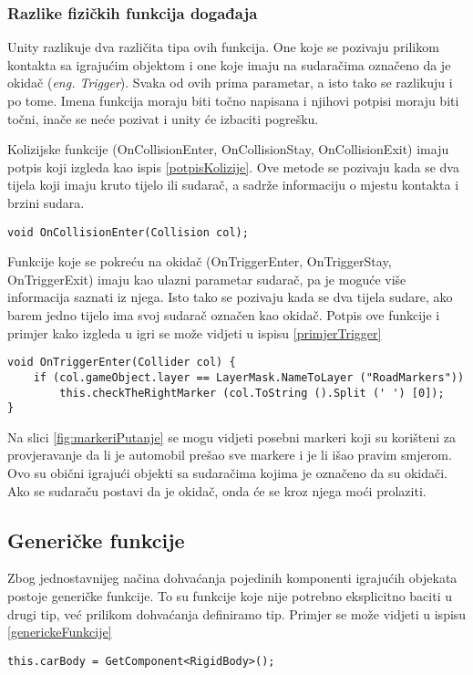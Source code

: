 \subsubsection{Razlike fizičkih funkcija događaja}
Unity razlikuje dva različita tipa ovih funkcija. One koje se pozivaju prilikom kontakta sa igrajućim objektom i one koje imaju na sudaračima označeno da je okidač (\emph{eng. Trigger}). Svaka od ovih prima parametar, a isto tako se razlikuju i po tome. Imena funkcija moraju biti točno napisana i njihovi potpisi moraju biti točni, inače se neće pozivat i unity će izbaciti pogrešku. \par
Kolizijske funkcije (OnCollisionEnter, OnCollisionStay, OnCollisionExit) imaju potpis koji izgleda kao ispis \ref{potpisKolizije}. Ove metode se pozivaju kada se dva tijela koji imaju kruto tijelo ili sudarač, a sadrže informaciju o mjestu kontakta i brzini sudara.
\begin{lstlisting}[caption={Potpis kolizijskih funkcija}, label=potpisKolizije]
void OnCollisionEnter(Collision col);
\end{lstlisting} \par
Funkcije koje se pokreću na okidač (OnTriggerEnter, OnTriggerStay, OnTriggerExit) imaju kao ulazni parametar sudarač, pa je moguće više informacija saznati iz njega. Isto tako se pozivaju kada se dva tijela sudare, ako barem jedno tijelo ima svoj sudarač označen kao okidač. Potpis ove funkcije i primjer kako izgleda u igri se može vidjeti u ispisu \ref{primjerTrigger}
\begin{lstlisting}[caption={Potpis i primjer trigger funkcije}, label=primjerTrigger]
void OnTriggerEnter(Collider col) {
	if (col.gameObject.layer == LayerMask.NameToLayer ("RoadMarkers"))
		this.checkTheRightMarker (col.ToString ().Split (' ') [0]);
}
\end{lstlisting} \par
Na slici \ref{fig:markeriPutanje} se mogu vidjeti posebni markeri koji su korišteni za provjeravanje da li je automobil prešao sve markere i je li išao pravim smjerom. Ovo su obični igrajući objekti sa sudaračima kojima je označeno da su okidači. Ako se sudaraču postavi da je okidač, onda će se kroz njega moći prolaziti. 
\subsection{Generičke funkcije}
Zbog jednostavnijeg načina dohvaćanja pojedinih komponenti igrajućih objekata postoje generičke funkcije. To su funkcije koje nije potrebno eksplicitno baciti u drugi tip, već prilikom dohvaćanja definiramo tip. Primjer se može vidjeti u ispisu \ref{generickeFunkcije}
\begin{lstlisting}[caption={Primjer generičke funkcije}, label=generickeFunkcije]
this.carBody = GetComponent<RigidBody>();
\end{lstlisting}